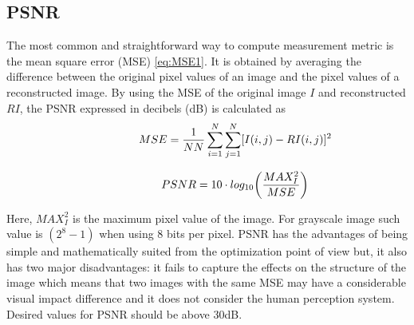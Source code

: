 \FloatBarrier

\subsection{PSNR} 
The most common and straightforward way to compute measurement metric is the mean square error (MSE) \ref{eq:MSE1}. It is obtained by averaging the difference between the original pixel values of an image and the pixel values of a reconstructed image. By using the MSE of the original image $I$ and reconstructed $RI$, the PSNR expressed in decibels (dB) is calculated as
\begin{equation} \label{eq:mse1}
\centering
\hspace{3em} \hspace{3em} \hspace{3em} MSE = \frac{1}{NN} \sum\limits_{i=1}^N \sum\limits_{j=1}^N [ I( i , j) - RI ( i , j ) ]^2    \enspace \enspace \hspace{3em}
\end{equation} 

\begin{equation} \label{eq:LS1}
\centering
\hspace{3em} \hspace{3em} \hspace{3em} PSNR = 10 \cdot log_{10} \bigg( \frac{ MAX_{I}^{2} }{MSE} \bigg) \enspace \enspace \hspace{3em}
\end{equation} 

Here, $MAX_{I}^{2}$ is the maximum pixel value of the image. For grayscale image such value is $(2^8 - 1)$ when using 8 bits per pixel. PSNR has the advantages of being simple and mathematically suited from the optimization point of view but, it also has two major disadvantages: it fails to capture the effects on the structure of the image which means that two images with the same MSE may have a considerable visual impact difference and it does not consider the human perception system. Desired values for PSNR should be above 30dB. 

\FloatBarrier

